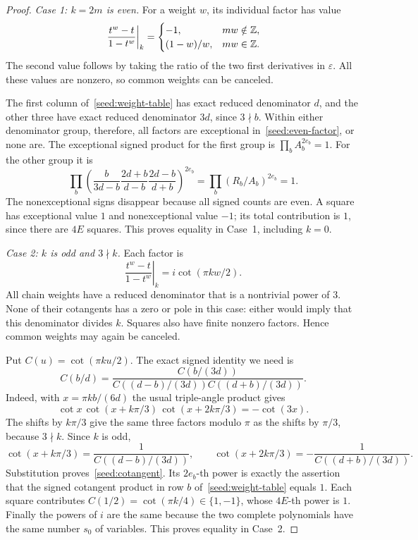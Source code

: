 \begin{proof}
\smallskip\noindent
\emph{Case 1: $k=2m$ is even.}
For a weight $w$, its individual factor has value
\begin{equation}\label{seed:even-factor}
 \left.\frac{t^w-t}{1-t^w}\right|_k
 =\begin{cases}
 -1,&mw\notin\mathbb Z,\\
 (1-w)/w,&mw\in\mathbb Z.
 \end{cases}
\end{equation}
The second value follows by taking the ratio of the two first
derivatives in $\varepsilon$.  All these values are nonzero, so common
weights can be canceled.

The first column of~\eqref{seed:weight-table} has exact reduced
denominator $d$, and the other three have exact reduced denominator
$3d$, since $3\nmid b$.  Within either denominator group, therefore,
all factors are exceptional in~\eqref{seed:even-factor}, or none are.
The exceptional signed product for the first group is
$\prod_b A_b^{2e_b}=1$.  For the other group it is
\[
 \prod_b\left(
 \frac{b}{3d-b}\frac{2d+b}{d-b}\frac{2d-b}{d+b}
 \right)^{2e_b}
 =\prod_b(R_b/A_b)^{2e_b}=1.
\]
The nonexceptional signs disappear because all signed counts are
even.  A square has exceptional value $1$ and nonexceptional value
$-1$; its total contribution is $1$, since there are $4E$ squares.
This proves equality in Case~1, including $k=0$.

\smallskip\noindent
\emph{Case 2: $k$ is odd and $3\nmid k$.}
Each factor is
\[
 \left.\frac{t^w-t}{1-t^w}\right|_k
     =i\cot(\pi k w/2).
\]
All chain weights have a reduced denominator that is a nontrivial
power of $3$.  None of their cotangents has a zero or pole in this
case: either would imply that this denominator divides $k$.
Squares also have finite nonzero factors.  Hence common weights may
again be canceled.

Put $C(u)=\cot(\pi ku/2)$.  The exact signed identity we need is
\begin{equation}\label{seed:cotangent}
 C(b/d)=
 \frac{C(b/(3d))}{C((d-b)/(3d))C((d+b)/(3d))}.
\end{equation}
Indeed, with $x=\pi kb/(6d)$ the usual triple-angle product gives
\[
 \cot x\,\cot(x+k\pi/3)\,\cot(x+2k\pi/3)=-\cot(3x).
\]
The shifts by $k\pi/3$ give the same three factors modulo $\pi$ as
the shifts by $\pi/3$, because $3\nmid k$.  Since $k$ is odd,
\[
 \cot(x+k\pi/3)=\frac{1}{C((d-b)/(3d))},\qquad
 \cot(x+2k\pi/3)=-\frac{1}{C((d+b)/(3d))}.
\]
Substitution proves~\eqref{seed:cotangent}.  Its $2e_b$-th power is
exactly the assertion that the signed cotangent product in row $b$
of~\eqref{seed:weight-table} equals $1$.
Each square contributes $C(1/2)=\cot(\pi k/4)\in\{1,-1\}$, whose
$4E$-th power is $1$.  Finally the powers of $i$ are the same because
the two complete polynomials have the same number $s_0$ of variables.
This proves equality in Case~2.


\end{proof}
